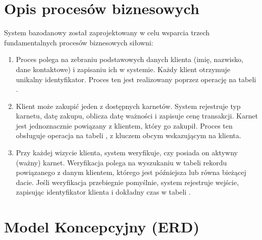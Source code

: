 \documentclass[letterpaper,10pt,polish]{sphinxmanual}
\begin{document}
\section{Opis procesów biznesowych}
\label{\detokenize{rozdzial3/rozdzial3:opis-procesow-biznesowych}}
\sphinxAtStartPar
System bazodanowy został zaprojektowany w celu wsparcia trzech fundamentalnych procesów biznesowych siłowni:
\begin{enumerate}
%
\item {} 
\sphinxAtStartPar
{} Proces polega na zebraniu podstawowych danych klienta (imię, nazwisko, dane kontaktowe) i zapisaniu ich w systemie. Każdy klient otrzymuje unikalny identyfikator. Proces ten jest realizowany poprzez operację  na tabeli .

\item {} 
\sphinxAtStartPar
{} Klient może zakupić jeden z dostępnych karnetów. System rejestruje typ karnetu, datę zakupu, oblicza datę ważności i zapisuje cenę transakcji. Karnet jest jednoznacznie powiązany z klientem, który go zakupił. Proces ten obsługuje operacja  na tabeli , z kluczem obcym wskazującym na klienta.

\item {} 
\sphinxAtStartPar
{} Przy każdej wizycie klienta, system weryfikuje, czy posiada on aktywny (ważny) karnet. Weryfikacja polega na wyszukaniu w tabeli  rekordu powiązanego z danym klientem, którego  jest późniejsza lub równa bieżącej dacie. Jeśli weryfikacja przebiegnie pomyślnie, system rejestruje wejście, zapisując identyfikator klienta i dokładny czas w tabeli .

\end{enumerate}


\section{Model Koncepcyjny (ERD)}
\label{\detokenize{rozdzial3/rozdzial3:model-koncepcyjny-erd}}
\noindent{}
\end{document}
